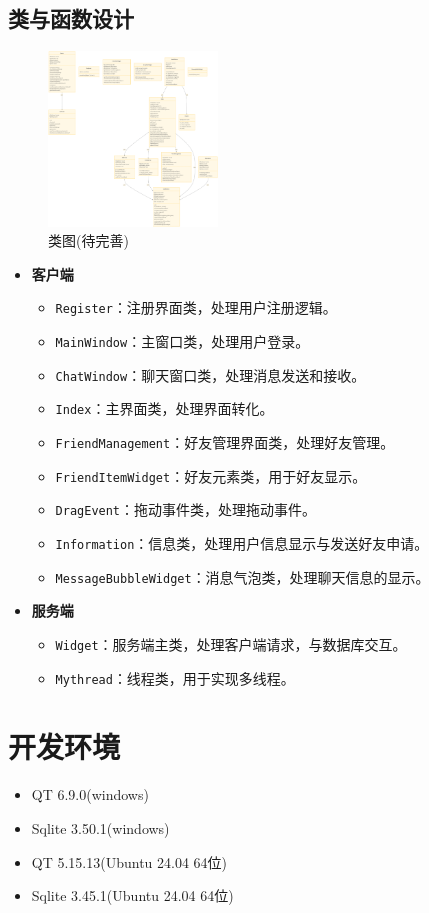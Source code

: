 \documentclass[UTF8]{ctexart}
\begin{document}
\subsection{类与函数设计}
\begin{figure}[h]
	\centering
	\includegraphics[width=0.4\textwidth]{class}
	\caption{类图(待完善)}
\end{figure}
\begin{itemize}
	\item \textbf{客户端}
	\begin{itemize}
		\item \texttt{Register}：注册界面类，处理用户注册逻辑。
		\item \texttt{MainWindow}：主窗口类，处理用户登录。
		\item \texttt{ChatWindow}：聊天窗口类，处理消息发送和接收。
		\item \texttt{Index}：主界面类，处理界面转化。
		\item \texttt{FriendManagement}：好友管理界面类，处理好友管理。
		\item \texttt{FriendItemWidget}：好友元素类，用于好友显示。
		\item \texttt{DragEvent}：拖动事件类，处理拖动事件。
		\item \texttt{Information}：信息类，处理用户信息显示与发送好友申请。
		\item \texttt{MessageBubbleWidget}：消息气泡类，处理聊天信息的显示。
	\end{itemize}
	\item \textbf{服务端}
	\begin{itemize}
		\item \texttt{Widget}：服务端主类，处理客户端请求，与数据库交互。
		\item \texttt{Mythread}：线程类，用于实现多线程。
	\end{itemize}
\end{itemize}
\section{开发环境}
\begin{itemize}
	\item QT 6.9.0(windows)
	\item Sqlite 3.50.1(windows)
	\item QT 5.15.13(Ubuntu 24.04 64位)
	\item Sqlite 3.45.1(Ubuntu 24.04 64位)
\end{itemize}
\end{document}
